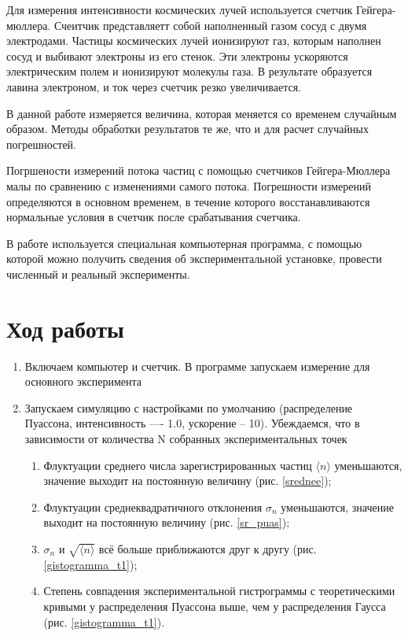 \documentclass[a4paper, 12pt]{article}
\begin{document}
Для измерения интенсивности космических лучей используется счетчик Гейгера-мюллера. Счеитчик представляетт собой наполненный газом сосуд с двумя электродами. Частицы космических лучей ионизируют газ, которым наполнен сосуд и выбивают электроны из его стенок. Эти электроны ускоряются электрическим полем и ионизируют молекулы газа. В результате образуется лавина электроном, и ток через счетчик резко увеличивается.

В данной работе измеряется величина, которая меняется со временем случайным образом. Методы обработки результатов те же, что и для расчет случайных погрешностей.

\noindent Погршености измерений потока частиц с помощью счетчиков Гейгера-Мюллера малы по сравнению с изменениями самого потока. Погрешности измерений определяются в основном временем, в течение которого восстанавливаются нормальные условия в счетчик после срабатывания счетчика.

В работе используется специальная компьютерная программа, с помощью которой можно получить сведения об экспериментальной установке, провести численный и реальный эксперименты.

\section*{Ход работы}

\begin{enumerate}
    \item Включаем компьютер и счетчик. В программе запускаем измерение для основного эксперимента
    \item Запускаем симуляцию с настройками по умолчанию (распределение Пуассона, интенсивность —- 1.0, ускорение -- 10). Убеждаемся, что в зависимости от количества N собранных экспериментальных точек
    \begin{enumerate}[label=\alph*)]
        \item Флуктуации среднего числа зарегистрированных частиц  $\langle n \rangle$ уменьшаются, значение выходит на постоянную величину (рис. \ref{srednee});
        \item Флуктуации среднеквадратичного отклонения $\sigma_{n}$ уменьшаются, значение выходит на постоянную величину (рис. \ref{sr_puas});
        \item $\sigma_{n}$ и $\sqrt{\langle n \rangle}$ всё больше приближаются друг к другу (рис. \ref{gistogramma_t1});
        \item Степень совпадения экспериментальной гистрограммы с теоретическими кривыми у распределения Пуассона выше, чем у распределения Гаусса (рис. \ref{gistogramma_t1}).
    \end{enumerate}
\end{enumerate}
\end{document}
